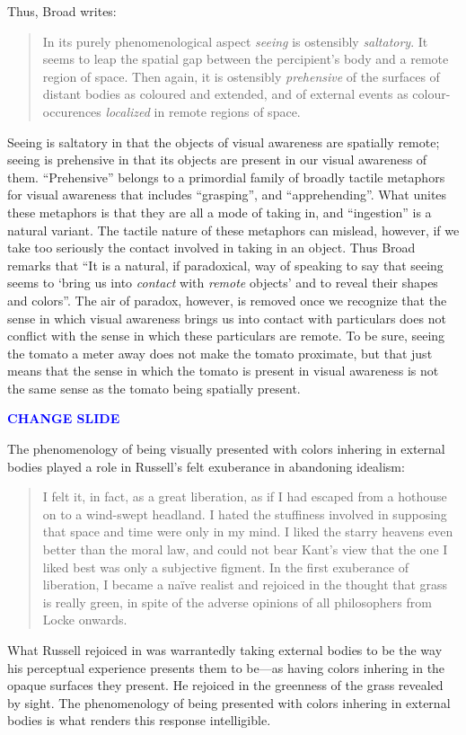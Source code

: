\documentclass[12pt]{article}
\newcommand{\change}{\textcolor{blue}{\textbf{CHANGE SLIDE}}}
\begin{document}
Thus, Broad writes:
\begin{quote}
    In its purely phenomenological aspect \emph{seeing} is ostensibly \emph{saltatory}. It seems to leap the spatial gap between the percipient's body and a remote region of space. Then again, it is ostensibly \emph{prehensive} of the surfaces of distant bodies as coloured and extended, and of external events as colour-occurences \emph{localized} in remote regions of space.
\end{quote}
Seeing is saltatory in that the objects of visual awareness are spatially remote; seeing is prehensive in that its objects are present in our visual awareness of them. ``Prehensive'' belongs to a primordial family of broadly tactile metaphors for visual awareness that includes ``grasping'', and ``apprehending''. What unites these metaphors is that they are all a mode of taking in, and ``ingestion'' is a natural variant. The tactile nature of these metaphors can mislead, however, if we take too seriously the contact involved in taking in an object. Thus Broad remarks that ``It is a natural, if paradoxical, way of speaking to say that seeing seems to `bring us into \emph{contact} with \emph{remote} objects' and to reveal their shapes and colors''. The air of paradox, however, is removed once we recognize that the sense in which visual awareness brings us into contact with particulars does not conflict with the sense in which these particulars are remote. To be sure, seeing the tomato a meter away does not make the tomato proximate, but that just means that the sense in which the tomato is present in visual awareness is not the same sense as the tomato being spatially present.

\change

The phenomenology of being visually presented with colors inhering in external bodies played a role in Russell's felt exuberance in abandoning idealism:
\begin{quote}
	I felt it, in fact, as a great liberation, as if I had escaped from a hothouse on to a wind-swept headland. I hated the stuffiness involved in supposing that space and time were only in my mind. I liked the starry heavens even better than the moral law, and could not bear Kant’s view that the one I liked best was only a subjective figment. In the first exuberance of liberation, I became a naïve realist and rejoiced in the thought that grass is really green, in spite of the adverse opinions of all philosophers from Locke onwards.
\end{quote}
What Russell rejoiced in was warrantedly taking external bodies to be the way his perceptual experience presents them to be---as having colors inhering in the opaque surfaces they present. He rejoiced in the greenness of the grass revealed by sight. The phenomenology of being presented with colors inhering in external bodies is what renders this response intelligible.
\end{document}
